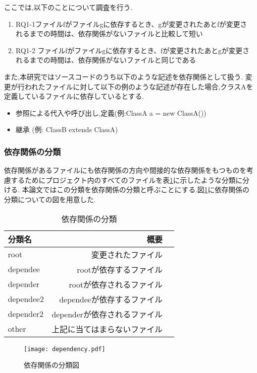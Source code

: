 \documentclass{fose2016}           %
\begin{document}
ここでは,以下のことについて調査を行う.
\begin{enumerate}
\item RQ1-1ファイルfがファイルgに依存するとき、gが変更されたあとfが変更されるまでの時間は、依存関係がないファイルと比較して短い
\item RQ1-2 ファイルfがファイルgに依存するとき、fが変更されたあとgが変更されるまでの時間は、依存関係がないファイルと同じである
\end{enumerate}

また,本研究ではソースコードのうち以下のような記述を依存関係として扱う.
変更が行われたファイルに対して以下の例のような記述が存在した場合,クラスAを定義しているファイルに依存しているとする.

\begin{itemize}
\item 参照による代入や呼び出し,定義(例:ClassA a = new ClassA())
\item 継承 (例: ClassB extends ClassA)
\end{itemize}

\subsubsection{依存関係の分類}
依存関係があるファイルにも依存関係の方向や間接的な依存関係をもつものを考慮するためにプロジェクト内のすべてのファイルを表\ref{tab:依存関係の分類}に示したような分類に分ける.
本論文ではこの分類を依存関係の分類と呼ぶことにする.図\ref{fig:dependency}に依存関係の分類についての図を用意した.

\begin{table}
\caption{依存関係の分類}
\begin{tabular}{|l|r|r|} \hline
分類名 & 概要 \\ \hline
root & 変更されたファイル \\ \hline
dependee & rootが依存するファイル \\ \hline
depender & rootが依存されるファイル \\ \hline
dependee2 & dependeeが依存するファイル \\ \hline
depender2 & dependerが依存されるファイル \\ \hline
other & 上記に当てはまらないファイル \\ \hline
\end{tabular}
\label{tab:依存関係の分類}
\end{table}

\begin{figure}[t]
\centering
\texttt{[image: dependency.pdf]}
\caption{依存関係の分類図}
\label{fig:dependency} 
\end{figure}
\end{document}
